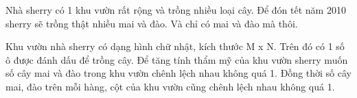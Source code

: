 Nhà sherry có 1 khu vườn rất rộng và trồng nhiều loại cây. Để đón tết năm 2010 sherry sẽ trồng thật nhiều mai và đào. Và chỉ có mai và đào mà thôi.  

   Khu vườn nhà sherry có dạng hình chữ nhật, kích thước M x N. Trên đó có 1 số ô được đánh dấu để trồng cây. Để tăng tính thẩm mỹ của khu vườn sherry muốn số cây mai và đào trong khu vườn chênh lệch nhau không quá 1. Đồng thời số cây mai, đào trên mỗi hàng, cột của khu vườn cũng chênh lệch nhau không quá 1.  

\